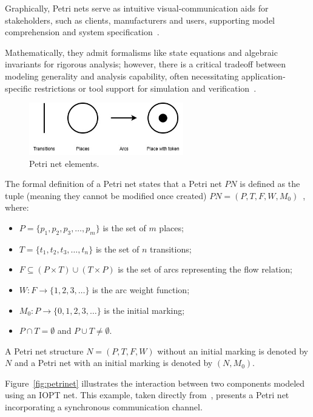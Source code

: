 Graphically, Petri nets serve as intuitive visual‐communication aids for stakeholders, such as clients, manufacturers and users, supporting model comprehension and system specification~\cite{pn-Wolfgang}.

 Mathematically, they admit formalisms like state equations and algebraic invariants for rigorous analysis; however, there is a critical tradeoff between modeling generality and analysis capability, often necessitating application‐specific restrictions or tool support for simulation and verification~\cite{murata}.


\begin{figure}[htbp]
  \centering
  \includegraphics[width=0.6\textwidth]{Chapters/Figures/petri_image.jpg}
  \caption{Petri net elements.}
  \label{fig:petri_diagrama}
\end{figure}



The formal definition of a Petri net states that a Petri net \( PN \) is defined as the tuple (meaning they cannot be modified once created) \( PN = (P, T, F, W, M_0) \)~\cite{murata}, where:


\begin{itemize}
    \item \( P = \{ p_1, p_2, p_3, \ldots, p_m \} \) is the set of \( m \) places;
    \item \( T = \{ t_1, t_2, t_3, \ldots, t_n \} \) is the set of \( n \) transitions;
    \item \( F \subseteq (P \times T) \cup (T \times P) \) is the set of arcs representing the flow relation;
    \item \( W : F \to \{1,2,3,\ldots\} \) is the arc weight function;
    \item \( M_0 : P \to \{0,1,2,3,\ldots\} \) is the initial marking;
    \item \( P \cap T = \emptyset \) and \( P \cup T \neq \emptyset \).
\end{itemize}

A Petri net structure \( N = (P, T, F, W) \) without an initial marking is denoted by \( N \) and a Petri net with an initial marking is denoted by \( (N, M_0) \).


Figure~\ref{fig:petrinet} illustrates the interaction between two components modeled using an IOPT net. This example, taken directly from~\cite{example}, presents a Petri net incorporating a synchronous communication channel.

